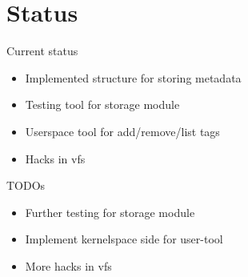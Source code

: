\documentclass{beamer}
\begin{document}
\section{Status}
\begin{frame}{Current status}
    \begin{itemize}
        \item {Implemented structure for storing metadata}
        \item {Testing tool for storage module}
        \item {Userspace tool for add/remove/list tags}
        \item {Hacks in vfs}
    \end{itemize}
\end{frame}

\begin{frame}{TODOs}
    \begin{itemize}
        \item {Further testing for storage module}
        \item {Implement kernelspace side for user-tool}
        \item {More hacks in vfs}
    \end{itemize}
\end{frame}
\end{document}
